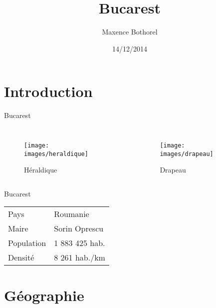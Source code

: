 \documentclass{beamer}
\title{Bucarest}
\author{Maxence Bothorel}
\institute{Licence professionnelle ASRALL,\\
	IUT Nancy Charlemagne,\\
	Nancy}
\date{14/12/2014}
\begin{document}
    \begin{frame}
		\maketitle{}
	\end{frame}

	\section{Introduction}
	\begin{frame}{Bucarest}
		\begin{columns}[c]
			\begin{figure}
				\caption{Héraldique}
				\texttt{[image: images/heraldique]}
			\end{figure}

			\begin{figure}
				\caption{Drapeau}
				\texttt{[image: images/drapeau]}
			\end{figure}
		\end{columns}
	\end{frame}
	
	\begin{frame}{Bucarest}
		\begin{center}
			\begin{tabular}{ll}
				Pays & Roumanie \\
				Maire & Sorin Oprescu \\
				Population & 1 883 425 hab. \\
				Densité & 8 261 hab./km\up{2} \\
			\end{tabular}
		\end{center}
	\end{frame}

	\section{Géographie}
\end{document}
